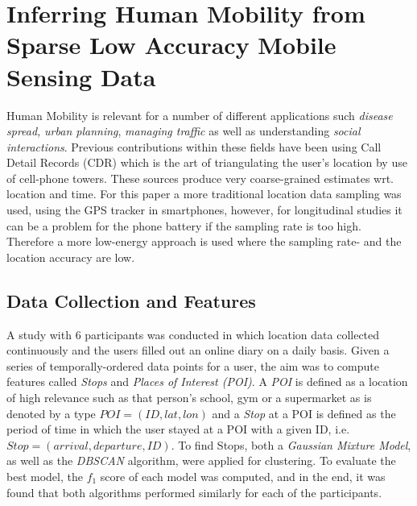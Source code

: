 \section{Inferring Human Mobility from Sparse Low Accuracy Mobile Sensing Data}
Human Mobility is relevant for a number of different applications such \textit{disease spread,} \textit{urban planning}, \textit{managing traffic }as well as understanding \textit{social interactions}. Previous contributions within these fields have been using Call Detail Records (CDR) which is the art of triangulating the user's location by use of cell-phone towers. These sources produce very coarse-grained estimates wrt. location and time. For this paper a more traditional location data sampling was used, using the GPS tracker in smartphones, however, for longitudinal studies it can be a problem for the phone battery if the sampling rate is too high. Therefore a more low-energy approach is used where the sampling rate- and the location accuracy are low. 

\subsection{Data Collection and Features}
A study with 6 participants was conducted in which location data collected continuously and the users filled out an online diary on a daily basis. Given a series of temporally-ordered data points for a user, the aim was to compute features called \textit{Stops} and \textit{Places of Interest (POI)}. A \textit{POI} is defined as a location of high relevance such as that person's school, gym or a supermarket as is denoted by a type $POI = (ID, lat, lon)$ and a \textit{Stop} at a POI is defined as the period of time in which the user stayed at a POI with a given ID, i.e. $Stop = (arrival, departure, ID)$. To find Stops, both a \textit{Gaussian Mixture Model}, as well as the \textit{DBSCAN} algorithm, were applied for clustering. To evaluate the best model, the $f_1$ score of each model was computed, and in the end, it was found that both algorithms performed similarly for each of the participants. 